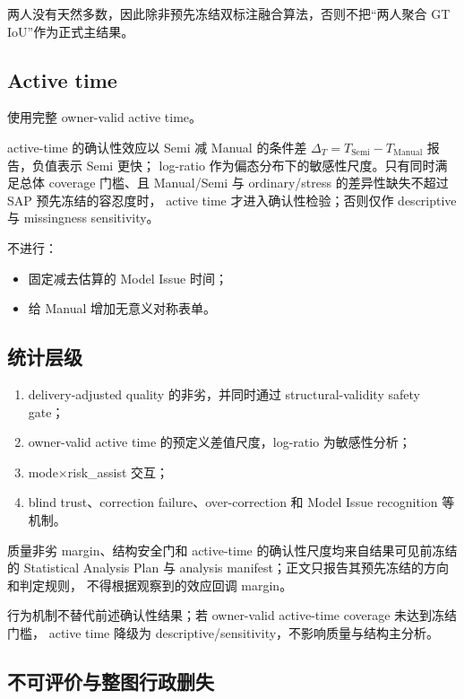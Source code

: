 两人没有天然多数，因此除非预先冻结双标注融合算法，否则不把“两人聚合 GT IoU”作为正式主结果。

\subsection{Active time}

使用完整 owner-valid active time。

active-time 的确认性效应以 Semi 减 Manual 的条件差
\(\Delta_T=T_{\mathrm{Semi}}-T_{\mathrm{Manual}}\) 报告，负值表示 Semi 更快；
log-ratio 作为偏态分布下的敏感性尺度。只有同时满足总体 coverage 门槛、且
Manual/Semi 与 ordinary/stress 的差异性缺失不超过 SAP 预先冻结的容忍度时，
active time 才进入确认性检验；否则仅作 descriptive 与 missingness sensitivity。

不进行：

\begin{itemize}
  \item 固定减去估算的 Model Issue 时间；
  \item 给 Manual 增加无意义对称表单。
\end{itemize}

\subsection{统计层级}

\begin{enumerate}
  \item delivery-adjusted quality 的非劣，并同时通过 structural-validity safety gate；
  \item owner-valid active time 的预定义差值尺度，log-ratio 为敏感性分析；
  \item mode\(\times\)risk\_assist 交互；
  \item blind trust、correction failure、over-correction 和 Model Issue recognition 等机制。
\end{enumerate}

质量非劣 margin、结构安全门和 active-time 的确认性尺度均来自结果可见前冻结的
Statistical Analysis Plan 与 analysis manifest；正文只报告其预先冻结的方向和判定规则，
不得根据观察到的效应回调 margin。

行为机制不替代前述确认性结果；若 owner-valid active-time coverage 未达到冻结门槛，
active time 降级为 descriptive/sensitivity，不影响质量与结构主分析。

\subsection{不可评价与整图行政删失}

